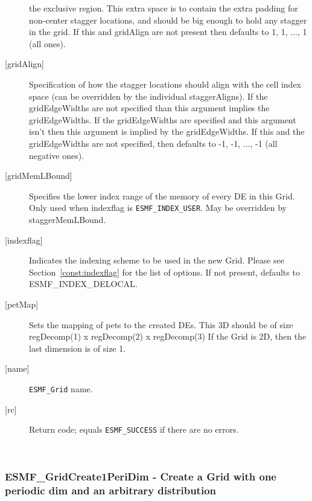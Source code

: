 \begin{description}
        the exclusive region. This extra space is to contain the extra
        padding for non-center stagger locations, and should be big enough
        to hold any stagger in the grid. If this and gridAlign are not present then
        defaults to 1, 1, ..., 1 (all ones).
   \item[{[gridAlign]}]
       Specification of how the stagger locations should align with the cell
       index space (can be overridden by the individual staggerAligns). If
       the gridEdgeWidths are not specified than this argument
       implies the gridEdgeWidths. If the gridEdgeWidths are specified and this argument isn't
       then this argument is implied by the gridEdgeWidths.
       If this and the gridEdgeWidths are not specified, then defaults to
      -1, -1, ..., -1 (all negative ones).
   \item[{[gridMemLBound]}]
        Specifies the lower index range of the memory of every DE in this Grid.
        Only used when indexflag is {\tt ESMF\_INDEX\_USER}. May be overridden
        by staggerMemLBound.
   \item[{[indexflag]}]
        Indicates the indexing scheme to be used in the new Grid. Please see
        Section~\ref{const:indexflag} for the list of options. If not present,
        defaults to ESMF\_INDEX\_DELOCAL.
   \item[{[petMap]}]
         Sets the mapping of pets to the created DEs. This 3D
         should be of size regDecomp(1) x regDecomp(2) x regDecomp(3)
         If the Grid is 2D, then the last dimension is of size 1.
   \item[{[name]}]
        {\tt ESMF\_Grid} name.
   \item[{[rc]}]
        Return code; equals {\tt ESMF\_SUCCESS} if there are no errors.
   \end{description}
   
 
\mbox{}\hrulefill\ 
 
\subsubsection [ESMF\_GridCreate1PeriDim] {ESMF\_GridCreate1PeriDim - Create a Grid with one periodic dim and an arbitrary distribution}


